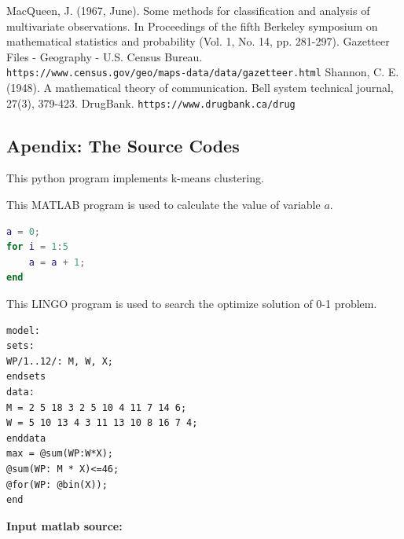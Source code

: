 \documentclass[11pt]{article}
\begin{document}
\begin{thebibliography}{99}
MacQueen, J. (1967, June). Some methods for classification and analysis of multivariate observations. In Proceedings of the fifth Berkeley symposium on mathematical statistics and probability (Vol. 1, No. 14, pp. 281-297).
Gazetteer Files - Geography - U.S. Census Bureau. \texttt{\\https://www.census.gov/geo/maps-data/data/gazetteer.html}
Shannon, C. E. (1948). A mathematical theory of communication. Bell system technical journal, 27(3), 379-423.
DrugBank. \texttt{https://www.drugbank.ca/drug}
\end{thebibliography}


\clearpage
\begin{subappendices}						%
\section*{Apendix: The Source Codes}		%

This python program implements k-means clustering.


This MATLAB program is used to calculate the value of variable $a$.
\begin{lstlisting}[language={Matlab}, caption=\texttt{temp.m}]
a = 0;
for i = 1:5
	a = a + 1;
end
\end{lstlisting}

This LINGO program is used to search the optimize solution of 0-1 problem.
\begin{lstlisting}[language=Lingo, caption=\texttt{temp.lg4}]
model:
sets:
WP/1..12/: M, W, X;
endsets
data:
M = 2 5 18 3 2 5 10 4 11 7 14 6;
W = 5 10 13 4 3 11 13 10 8 16 7 4;
enddata
max = @sum(WP:W*X);
@sum(WP: M * X)<=46;
@for(WP: @bin(X));
end
\end{lstlisting}

\textbf{\textcolor[rgb]{0.98,0.00,0.00}{Input matlab source:}}
% 

\end{subappendices}
\end{document}
